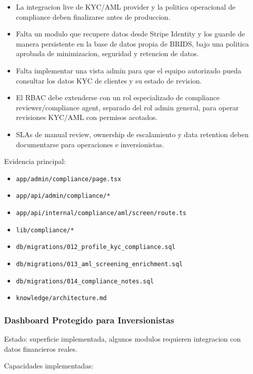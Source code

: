 \documentclass[
  10pt,
  letterpaper,
]{article}
\providecommand{\tightlist}{%
  \setlength{\itemsep}{0pt}\setlength{\parskip}{0pt}}
\let\oldtexttt\texttt
\renewcommand{\texttt}[1]{\oldtexttt{\small #1}}
\begin{document}
\begin{itemize}
\tightlist
\item
  La integracion live de KYC/AML provider y la politica operacional de
  compliance deben finalizarse antes de produccion.
\item
  Falta un modulo que recupere datos desde Stripe Identity y los guarde
  de manera persistente en la base de datos propia de BRIDS, bajo una
  politica aprobada de minimizacion, seguridad y retencion de datos.
\item
  Falta implementar una vista admin para que el equipo autorizado pueda
  consultar los datos KYC de clientes y su estado de revision.
\item
  El RBAC debe extenderse con un rol especializado de compliance
  reviewer/compliance agent, separado del rol admin general, para operar
  revisiones KYC/AML con permisos acotados.
\item
  SLAs de manual review, ownership de escalamiento y data retention
  deben documentarse para operaciones e inversionistas.
\end{itemize}

Evidencia principal:

\begin{itemize}
\tightlist
\item
  \texttt{app/admin/compliance/page.tsx}
\item
  \texttt{app/api/admin/compliance/*}
\item
  \texttt{app/api/internal/compliance/aml/screen/route.ts}
\item
  \texttt{lib/compliance/*}
\item
  \texttt{db/migrations/012\_profile\_kyc\_compliance.sql}
\item
  \texttt{db/migrations/013\_aml\_screening\_enrichment.sql}
\item
  \texttt{db/migrations/014\_compliance\_notes.sql}
\item
  \texttt{knowledge/architecture.md}
\end{itemize}

\subsubsection{Dashboard Protegido para
Inversionistas}\label{dashboard-protegido-para-inversionistas}

Estado: superficie implementada, algunos modulos requieren integracion
con datos financieros reales.

Capacidades implementadas:
\end{document}
